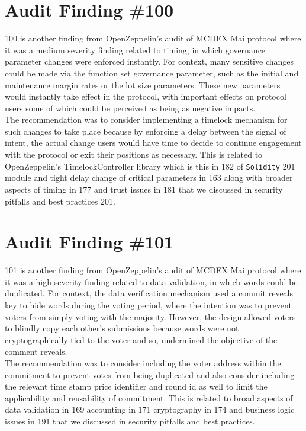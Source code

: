 \section{Audit Finding \#100}

100 is another finding from OpenZeppelin's audit of MCDEX Mai protocol where it was a medium severity finding related to timing, in which governance parameter changes were enforced instantly. For context, many sensitive changes could be made via the function set governance parameter, such as the initial and maintenance margin rates or the lot size parameters. These new parameters would instantly take effect in the protocol, with important effects on protocol users some of which could be perceived as being as negative impacts.\\

The recommendation was to consider implementing a timelock mechanism for such changes to take place because by enforcing a delay between the signal of intent, the actual change users would have time to decide to continue engagement with the protocol or exit their positions as necessary. This is related to OpenZeppelin's TimelockController library which is this in 182 of \verb|Solidity| 201 module and tight delay change of critical parameters in 163 along with broader aspects of timing in 177 and trust issues in 181 that we discussed in security pitfalls and best practices 201.

\section{Audit Finding \#101}

101 is another finding from OpenZeppelin's audit of MCDEX Mai protocol where it was a high severity finding related to data validation, in which words could be duplicated. For context, the data verification mechanism used a commit reveals key to hide words during the voting period, where the intention was to prevent voters from simply voting with the majority. However, the design allowed voters to blindly copy each other's submissions because words were not cryptographically tied to the voter and so, undermined the objective of the comment reveals.\\

The recommendation was to consider including the voter address within the commitment to prevent votes from being duplicated and also consider including the relevant time stamp price identifier and round id as well to limit the applicability and reusability of commitment. This is related to broad aspects of data validation in 169 accounting in 171 cryptography in 174 and business logic issues in 191 that we discussed in security pitfalls and best practices.
